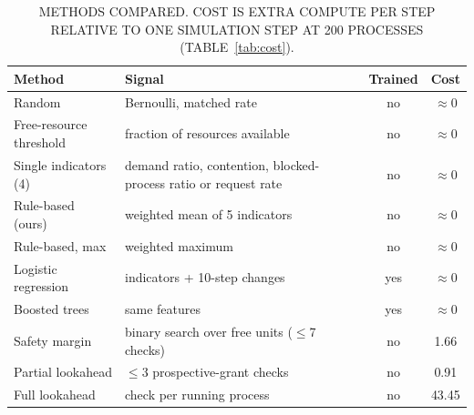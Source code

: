 \documentclass[conference]{IEEEtran}
\begin{document}
\begin{table}[t]
\centering\footnotesize
\caption{METHODS COMPARED. COST IS EXTRA COMPUTE PER STEP RELATIVE TO ONE SIMULATION STEP AT 200 PROCESSES (TABLE~\ref{tab:cost}).}
\label{tab:methods}
\begin{tabular}{>{\raggedright\arraybackslash}p{2.1cm}>{\raggedright\arraybackslash}p{2.9cm}cc}
\toprule
Method & Signal & Trained & Cost \\
\midrule
Random & Bernoulli, matched rate & no & $\approx$0 \\
Free-resource threshold & fraction of resources available & no & $\approx$0 \\
Single indicators (4) & demand ratio, contention, blocked-process ratio or request rate & no & $\approx$0 \\
Rule-based (ours) & weighted mean of 5 indicators & no & $\approx$0 \\
Rule-based, max & weighted maximum & no & $\approx$0 \\
Logistic regression & 5 indicators + 10-step changes & yes & $\approx$0 \\
Boosted trees & same features & yes & $\approx$0 \\
Safety margin & binary search over free units ($\le$7 checks) & no & 1.66 \\
Partial lookahead & $\le$3 prospective-grant checks & no & 0.91 \\
Full lookahead & 1 check per running process & no & 43.45 \\
\bottomrule
\end{tabular}
\end{table}
\end{document}
